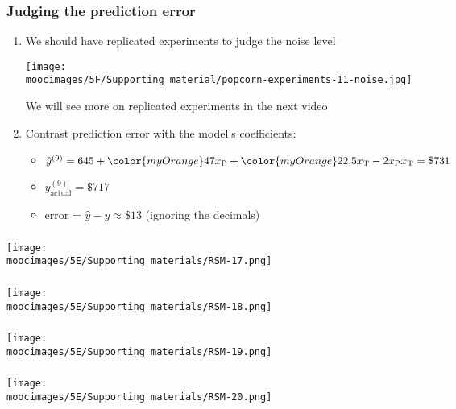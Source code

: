 \documentclass[handout,11pt,aspectratio=169,mathserif]{beamer}
\begin{document}
\begin{frame}\frametitle{Judging the prediction error}
	\begin{enumerate}
		\item	We should have replicated experiments to judge the noise level
		
		\centerline{
			\texttt{[image: \\moocimages/5F/Supporting material/popcorn-experiments-11-noise.jpg]}}
		{\small We will see more on replicated experiments in the next video}
		
		\vspace{1cm}
		\pause
		
		\item	Contrast prediction error with the model's coefficients:
		\begin{itemize}
			\item	$\hat{y}^{(9)}  = 645 + {\color{myOrange}47} x_\text{P}+ {\color{myOrange}22.5} x_\text{T} - 2x_\text{P}x_\text{T} = \$731$
			\item	$y_\text{actual}^{(9)} = \$717$ 
			\item	error = $\hat{y} - y \approx \$ 13 $ (ignoring the decimals)
		\end{itemize}
		
	\end{enumerate}
\end{frame}

\begin{frame}\frametitle{}
	\centerline{\texttt{[image: \\moocimages/5E/Supporting materials/RSM-17.png]}}
\end{frame}
\begin{frame}\frametitle{}
	\centerline{\texttt{[image: \\moocimages/5E/Supporting materials/RSM-18.png]}}
\end{frame}
\begin{frame}\frametitle{}
	\centerline{\texttt{[image: \\moocimages/5E/Supporting materials/RSM-19.png]}}
\end{frame}
\begin{frame}\frametitle{}
	\centerline{\texttt{[image: \\moocimages/5E/Supporting materials/RSM-20.png]}}
\end{frame}
\end{document}
